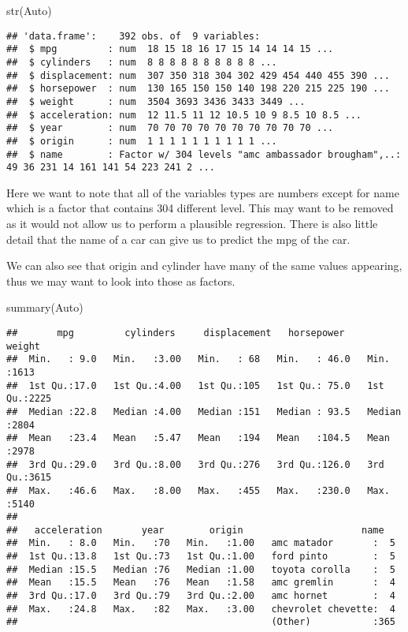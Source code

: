 \documentclass[
]{article}
\newenvironment{Shaded}{\begin{snugshade}}{\end{snugshade}}
\newcommand{\FunctionTok}[1]{\textcolor[rgb]{0.00,0.00,0.00}{#1}}
\newcommand{\NormalTok}[1]{#1}
\begin{document}
\begin{Shaded}
\begin{Highlighting}[]
\FunctionTok{str}\NormalTok{(Auto)}
\end{Highlighting}
\end{Shaded}

\begin{verbatim}
## 'data.frame':    392 obs. of  9 variables:
##  $ mpg         : num  18 15 18 16 17 15 14 14 14 15 ...
##  $ cylinders   : num  8 8 8 8 8 8 8 8 8 8 ...
##  $ displacement: num  307 350 318 304 302 429 454 440 455 390 ...
##  $ horsepower  : num  130 165 150 150 140 198 220 215 225 190 ...
##  $ weight      : num  3504 3693 3436 3433 3449 ...
##  $ acceleration: num  12 11.5 11 12 10.5 10 9 8.5 10 8.5 ...
##  $ year        : num  70 70 70 70 70 70 70 70 70 70 ...
##  $ origin      : num  1 1 1 1 1 1 1 1 1 1 ...
##  $ name        : Factor w/ 304 levels "amc ambassador brougham",..: 49 36 231 14 161 141 54 223 241 2 ...
\end{verbatim}

Here we want to note that all of the variables types are numbers except
for name which is a factor that contains 304 different level. This may
want to be removed as it would not allow us to perform a plausible
regression. There is also little detail that the name of a car can give
us to predict the mpg of the car.

We can also see that origin and cylinder have many of the same values
appearing, thus we may want to look into those as factors.

\begin{Shaded}
\begin{Highlighting}[]
\FunctionTok{summary}\NormalTok{(Auto)}
\end{Highlighting}
\end{Shaded}

\begin{verbatim}
##       mpg         cylinders     displacement   horsepower        weight    
##  Min.   : 9.0   Min.   :3.00   Min.   : 68   Min.   : 46.0   Min.   :1613  
##  1st Qu.:17.0   1st Qu.:4.00   1st Qu.:105   1st Qu.: 75.0   1st Qu.:2225  
##  Median :22.8   Median :4.00   Median :151   Median : 93.5   Median :2804  
##  Mean   :23.4   Mean   :5.47   Mean   :194   Mean   :104.5   Mean   :2978  
##  3rd Qu.:29.0   3rd Qu.:8.00   3rd Qu.:276   3rd Qu.:126.0   3rd Qu.:3615  
##  Max.   :46.6   Max.   :8.00   Max.   :455   Max.   :230.0   Max.   :5140  
##                                                                            
##   acceleration       year        origin                     name    
##  Min.   : 8.0   Min.   :70   Min.   :1.00   amc matador       :  5  
##  1st Qu.:13.8   1st Qu.:73   1st Qu.:1.00   ford pinto        :  5  
##  Median :15.5   Median :76   Median :1.00   toyota corolla    :  5  
##  Mean   :15.5   Mean   :76   Mean   :1.58   amc gremlin       :  4  
##  3rd Qu.:17.0   3rd Qu.:79   3rd Qu.:2.00   amc hornet        :  4  
##  Max.   :24.8   Max.   :82   Max.   :3.00   chevrolet chevette:  4  
##                                             (Other)           :365
\end{verbatim}
\end{document}
